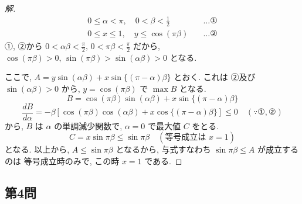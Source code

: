 \documentclass[../main.tex]{subfiles}
\begin{document}
\begin{proof}[解]
  \begin{align}
    0 \le \alpha < \pi, \quad 0 < \beta < \frac{1}{2} &\quad \dots \text{①} \\
    0 \le x \le 1, \quad y \le \cos(\pi\beta) &\quad \dots \text{②}
  \end{align}
  ①, ②から $0 < \alpha\beta < \frac{\pi}{2}, \, 0 < \pi\beta < \frac{\pi}{2}$ だから, $\cos(\pi\beta) > 0, \, \sin(\pi\beta) > \sin(\alpha\beta) > 0$ となる.

  ここで, $A = y \sin(\alpha\beta) + x \sin\{(\pi-\alpha)\beta\}$ とおく. これは ②及び $\sin(\alpha\beta) > 0$ から,
  $y = \cos(\pi\beta)$ で $\max B$ となる.
  \[ B = \cos(\pi\beta) \sin(\alpha\beta) + x \sin\{(\pi-\alpha)\beta\} \]
  \[ \frac{dB}{d\alpha} = -\beta [ \cos(\pi\beta) \cos(\alpha\beta) + x \cos\{(\pi-\alpha)\beta\} ] \le 0 \quad (\because \text{①}, \text{②}) \]
  から, $B$ は $\alpha$ の単調減少関数で, $\alpha = 0$ で最大値 $C$ をとる.
  \[ C = x \sin\pi\beta \le \sin\pi\beta \quad (\text{等号成立は } x=1) \]
  となる. 以上から, $A \le \sin\pi\beta$ となるから, 与式すなわち $\sin\pi\beta \le A$ が成立するのは
  等号成立時のみで, この時 $x=1$ である.
\end{proof}

\newpage

\subsection*{第4問}
\end{document}
